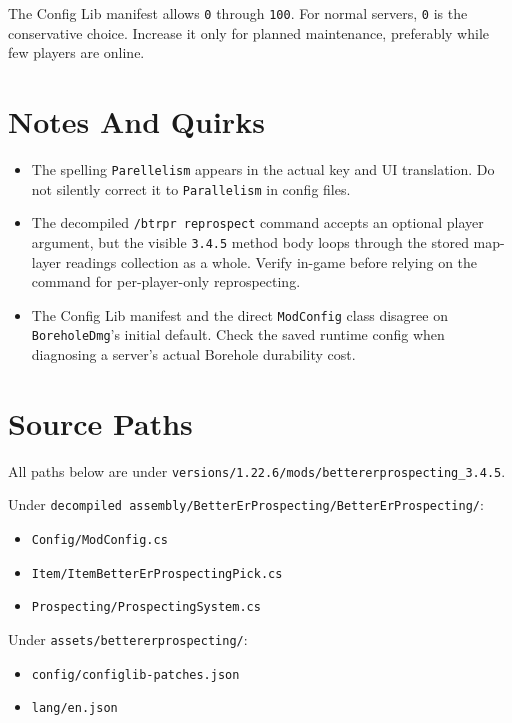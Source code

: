 \documentclass[
  11pt,
  letterpaper,
  titlepage]{article}
\providecommand{\tightlist}{%
  \setlength{\itemsep}{0pt}\setlength{\parskip}{0pt}}
\begin{document}
The Config Lib manifest allows \texttt{0} through \texttt{100}. For
normal servers, \texttt{0} is the conservative choice. Increase it only
for planned maintenance, preferably while few players are online.

\section{Notes And Quirks}\label{notes-and-quirks}

\begin{itemize}
\tightlist
\item
  The spelling \texttt{Parellelism} appears in the actual key and UI
  translation. Do not silently correct it to \texttt{Parallelism} in
  config files.
\item
  The decompiled \texttt{/btrpr\ reprospect} command accepts an optional
  player argument, but the visible \texttt{3.4.5} method body loops
  through the stored map-layer readings collection as a whole. Verify
  in-game before relying on the command for per-player-only
  reprospecting.
\item
  The Config Lib manifest and the direct \texttt{ModConfig} class
  disagree on \texttt{BoreholeDmg}'s initial default. Check the saved
  runtime config when diagnosing a server's actual Borehole durability
  cost.
\end{itemize}

\section{Source Paths}\label{source-paths}

All paths below are under
\texttt{versions/1.22.6/mods/bettererprospecting\_3.4.5}.

Under
\texttt{decompiled\ assembly/BetterErProspecting/BetterErProspecting/}:

\begin{itemize}
\tightlist
\item
  \texttt{Config/ModConfig.cs}
\item
  \texttt{Item/ItemBetterErProspectingPick.cs}
\item
  \texttt{Prospecting/ProspectingSystem.cs}
\end{itemize}

Under \texttt{assets/bettererprospecting/}:

\begin{itemize}
\tightlist
\item
  \texttt{config/configlib-patches.json}
\item
  \texttt{lang/en.json}
\end{itemize}
\end{document}
